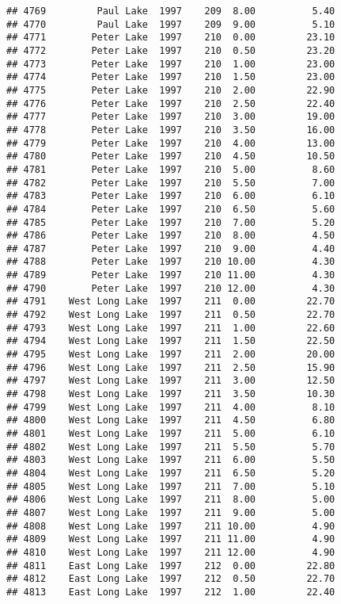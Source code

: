 \documentclass[
]{article}
\begin{document}
\begin{verbatim}
## 4769         Paul Lake  1997    209  8.00          5.40
## 4770         Paul Lake  1997    209  9.00          5.10
## 4771        Peter Lake  1997    210  0.00         23.10
## 4772        Peter Lake  1997    210  0.50         23.20
## 4773        Peter Lake  1997    210  1.00         23.00
## 4774        Peter Lake  1997    210  1.50         23.00
## 4775        Peter Lake  1997    210  2.00         22.90
## 4776        Peter Lake  1997    210  2.50         22.40
## 4777        Peter Lake  1997    210  3.00         19.00
## 4778        Peter Lake  1997    210  3.50         16.00
## 4779        Peter Lake  1997    210  4.00         13.00
## 4780        Peter Lake  1997    210  4.50         10.50
## 4781        Peter Lake  1997    210  5.00          8.60
## 4782        Peter Lake  1997    210  5.50          7.00
## 4783        Peter Lake  1997    210  6.00          6.10
## 4784        Peter Lake  1997    210  6.50          5.60
## 4785        Peter Lake  1997    210  7.00          5.20
## 4786        Peter Lake  1997    210  8.00          4.50
## 4787        Peter Lake  1997    210  9.00          4.40
## 4788        Peter Lake  1997    210 10.00          4.30
## 4789        Peter Lake  1997    210 11.00          4.30
## 4790        Peter Lake  1997    210 12.00          4.30
## 4791    West Long Lake  1997    211  0.00         22.70
## 4792    West Long Lake  1997    211  0.50         22.70
## 4793    West Long Lake  1997    211  1.00         22.60
## 4794    West Long Lake  1997    211  1.50         22.50
## 4795    West Long Lake  1997    211  2.00         20.00
## 4796    West Long Lake  1997    211  2.50         15.90
## 4797    West Long Lake  1997    211  3.00         12.50
## 4798    West Long Lake  1997    211  3.50         10.30
## 4799    West Long Lake  1997    211  4.00          8.10
## 4800    West Long Lake  1997    211  4.50          6.80
## 4801    West Long Lake  1997    211  5.00          6.10
## 4802    West Long Lake  1997    211  5.50          5.70
## 4803    West Long Lake  1997    211  6.00          5.50
## 4804    West Long Lake  1997    211  6.50          5.20
## 4805    West Long Lake  1997    211  7.00          5.10
## 4806    West Long Lake  1997    211  8.00          5.00
## 4807    West Long Lake  1997    211  9.00          5.00
## 4808    West Long Lake  1997    211 10.00          4.90
## 4809    West Long Lake  1997    211 11.00          4.90
## 4810    West Long Lake  1997    211 12.00          4.90
## 4811    East Long Lake  1997    212  0.00         22.80
## 4812    East Long Lake  1997    212  0.50         22.70
## 4813    East Long Lake  1997    212  1.00         22.40

\end{verbatim}
\end{document}

